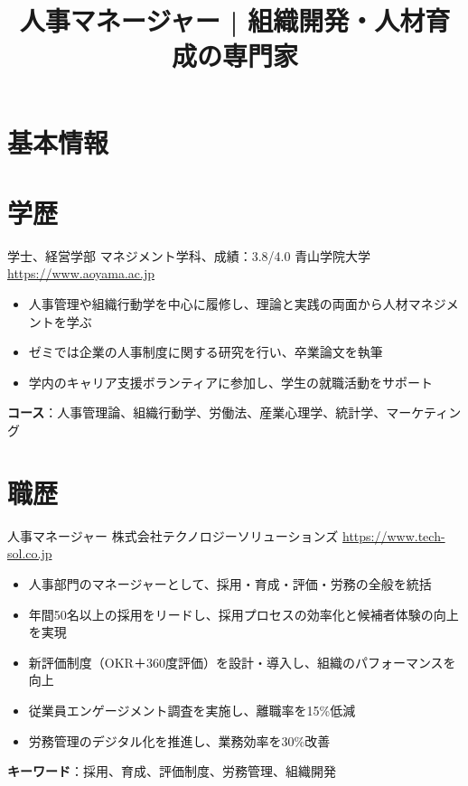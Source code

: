 \documentclass[a4paper, serif, 10pt]{moderncv}
\title{人事マネージャー | 組織開発・人材育成の専門家}
\begin{document}
\maketitle

\section{基本情報}

\section{学歴}

        {学士、経営学部 マネジメント学科、成績：3.8/4.0}
        {青山学院大学}
        {\url{https://www.aoyama.ac.jp}}
        {}
        {\begin{itemize}
\item 人事管理や組織行動学を中心に履修し、理論と実践の両面から人材マネジメントを学ぶ
\item ゼミでは企業の人事制度に関する研究を行い、卒業論文を執筆
\item 学内のキャリア支援ボランティアに参加し、学生の就職活動をサポート
\end{itemize}
\textbf{コース}：人事管理論、組織行動学、労働法、産業心理学、統計学、マーケティング}
\section{職歴}

        {人事マネージャー}
        {株式会社テクノロジーソリューションズ}
        {\url{https://www.tech-sol.co.jp}}
        {}
        {\begin{itemize}
\item 人事部門のマネージャーとして、採用・育成・評価・労務の全般を統括
\item 年間50名以上の採用をリードし、採用プロセスの効率化と候補者体験の向上を実現
\item 新評価制度（OKR＋360度評価）を設計・導入し、組織のパフォーマンスを向上
\item 従業員エンゲージメント調査を実施し、離職率を15\%低減
\item 労務管理のデジタル化を推進し、業務効率を30\%改善
\end{itemize}
\textbf{キーワード}：採用、育成、評価制度、労務管理、組織開発}
\end{document}
